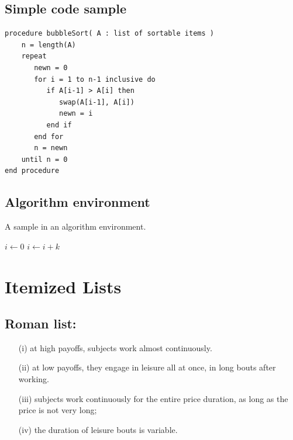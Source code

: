 \documentclass[NETN]{stjour}
\begin{document}
\subsection{Simple code sample}

\begin{code}
\begin{verbatim}
procedure bubbleSort( A : list of sortable items )
    n = length(A)
    repeat
       newn = 0
       for i = 1 to n-1 inclusive do
          if A[i-1] > A[i] then
             swap(A[i-1], A[i])
             newn = i
          end if
       end for
       n = newn
    until n = 0
end procedure
\end{verbatim}
\end{code}


\subsection{Algorithm environment}

\begin{algorithm}[h]
\caption{A sample in an algorithm environment.}
\begin{algorithmic}
    \State $i\gets 0$
\Else
        \State $i\gets i+k$
    \EndIf
\EndIf
\end{algorithmic}
\end{algorithm}


\section{Itemized Lists}

\subsection{Roman list:}

\begin{enumerate}
\item[(i)] at high 
payoffs, subjects work almost continuously.
\item[(ii)] at low payoffs, they 
engage in leisure all at once, in long bouts after working.
\item[(iii)] subjects work continuously for the entire price duration, as long as
the price is not very long;
\item[(iv)] the duration of leisure bouts is variable.
\end{enumerate}
\end{document}
